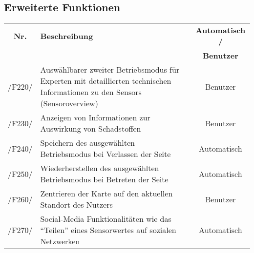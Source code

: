 \subsection{Erweiterte Funktionen}
\begin{tabularx}{\textwidth}{| c | X | c |}
\hline
        \textbf{Nr.} & 
        \textbf{Beschreibung} & 
        \textbf{Automatisch /} \\
        & & \textbf{Benutzer} \\
        \hline
        /F220/ & Auswählbarer zweiter Betriebsmodus für Experten mit detaillierten technischen Informationen zu den \glspl{Sensor} (\gls{Sensoroverview}) & Benutzer \\
        \hline
        /F230/ & Anzeigen von Informationen zur Auswirkung von Schadstoffen & Benutzer \\
        \hline
        /F240/ & Speichern des ausgewählten Betriebsmodus bei Verlassen der Seite & Automatisch \\
        \hline
        /F250/ & Wiederherstellen des ausgewählten Betriebsmodus bei Betreten der Seite & Automatisch \\
        \hline
        /F260/ & Zentrieren der Karte auf den aktuellen Standort des Nutzers & Benutzer \\
        \hline
        /F270/ & Social-Media Funktionalitäten wie das \enquote{Teilen} eines Sensorwertes auf sozialen Netzwerken & Automatisch \\
        \hline
\end{tabularx}
